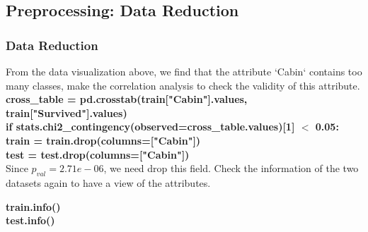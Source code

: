 \documentclass{beamer}
\begin{document}
\subsection{Preprocessing: Data Reduction}
\begin{frame}
	\frametitle{Data Reduction}
	\begin{flushleft}
		From the data visualization above, we find that the attribute `Cabin` contains too many classes, make the correlation analysis to check the validity of this attribute. \\
		\textbf{\color{blue}
			cross\_table = pd.crosstab(train["Cabin"].values, train["Survived"].values) \\
			if stats.chi2\_contingency(observed=cross\_table.values)[1] $<$ 0.05:\\
	    \quad train = train.drop(columns=["Cabin"]) \\
	    \quad test = test.drop(columns=["Cabin"])
		} \\
		Since $p_{val} = 2.71e-06$, we need drop this field. Check the information of the two datasets again to have a view of the attributes.
	\end{flushleft}
	\begin{center}
		\textbf{\color{blue}\footnotesize train.info()}\\
		\textbf{\color{blue}\footnotesize test.info()}~~
	\end{center}
\end{frame}
\end{document}
